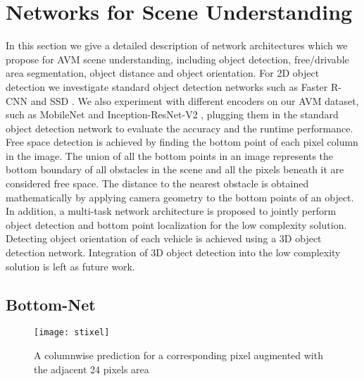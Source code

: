 \documentclass[10pt,twocolumn,letterpaper]{article}
\begin{document}
\section{Networks for Scene Understanding}
In this section we give a detailed description of network architectures which we propose for AVM scene understanding, including object detection, free/drivable area segmentation, object distance and object orientation. For 2D object detection we investigate standard object detection networks such as Faster R-CNN and SSD \cite{ssd}. We also experiment with different encoders on our AVM dataset, such as MobileNet \cite{mobilenet} and Inception-ResNet-V2 \cite{inc-res-v2}, plugging them in the standard object detection network to evaluate the accuracy and the runtime performance. Free space detection is achieved by finding the bottom point of each pixel column in the image. The union of all the bottom points in an image represents the bottom boundary of all obstacles in the scene and all the pixels beneath it are considered free space. The distance to the nearest obstacle is obtained mathematically by applying camera geometry to the bottom points of an object. In addition, a multi-task network architecture is proposed to jointly perform object detection and bottom point localization for the low complexity solution. Detecting object orientation of each vehicle  is achieved using a 3D object detection network. Integration of 3D object detection into the low complexity solution is left as future work.

\subsection{Bottom-Net}

\begin{figure}[t]
\begin{center}
\texttt{[image: stixel]}
\end{center}
   \caption{A columnwise prediction for a corresponding pixel augmented with the adjacent 24 pixels area}
\label{fig:stixel}
\end{figure}
\end{document}
